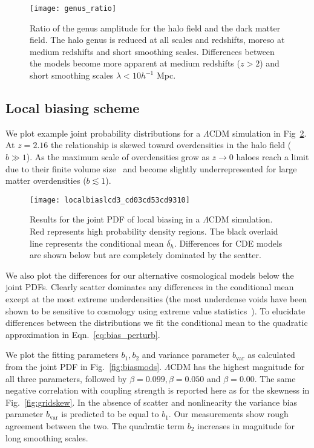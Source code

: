 \begin{figure}
	\centering
	\texttt{[image: genus\_ratio]}
    \caption{Ratio of the genus amplitude for the halo field and the dark matter field. The halo genus is reduced at all scales and redshifts, moreso at medium redshifts and short smoothing scales. Differences between the models become more apparent at medium redshifts ($z>2$) and short smoothing scales $\lambda < 10 h^{-1}$ Mpc.}
    \label{fig:genus_ratio}
\end{figure}

\subsection{Local biasing scheme}

We plot example joint probability distributions for a $\Lambda$CDM simulation in Fig~\ref{fig:localbias}. At $z=2.16$ the relationship is skewed toward overdensities in the halo field ($b \gg 1$). As the maximum scale of overdensities grow as $z \to 0$ haloes reach a limit due to their finite volume size~\citep{Yoshikawa2001} and become slightly underrepresented for large matter overdensities ($b \lesssim 1$).

\begin{figure}
	\centering
	\texttt{[image: localbiaslcd3\_cd03cd53cd9310]}
    \caption{Results for the joint PDF of local biasing in a $\Lambda$CDM simulation. Red represents high probability density regions. The black overlaid line represents the conditional mean $\overline{\delta_h}$. Differences for CDE models are shown below but are completely dominated by the scatter.}
    \label{fig:localbias}
\end{figure}
We also plot the differences for our alternative cosmological models below the joint PDFs. Clearly scatter dominates any differences in the conditional mean except at the most extreme underdensities (the most underdense voids have been shown to be sensitive to cosmology using extreme value statistics~\citealt{2015JCAP...05..062C}). To elucidate differences between the distributions we fit the conditional mean to the quadratic approximation in Eqn.~\ref{eq:bias_perturb}.

We plot the fitting parameters $b_1,b_2$ and variance parameter $b_{\mathrm{var}}$ as calculated from the joint PDF in Fig.~\ref{fig:biasmods}. $\Lambda$CDM has the highest magnitude for all three parameters, followed by $\beta=0.099,\beta=0.050$ and $\beta=0.00$. The same negative correlation with coupling strength is reported here as for the skewness in Fig.~\ref{fig:gridskew}. In the absence of scatter and nonlinearity the variance bias parameter  $b_{\mathrm{var}}$ is predicted to be equal to $b_1$. Our measurements show rough agreement between the two. The quadratic term $b_2$ increases in magnitude for long smoothing scales.

